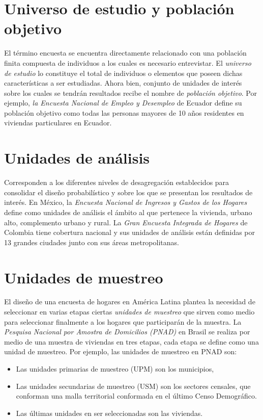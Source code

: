 \documentclass[
  spanish,
  12pt,
]{book}
\providecommand{\tightlist}{%
  \setlength{\itemsep}{0pt}\setlength{\parskip}{0pt}}
\begin{document}
\section{Universo de estudio y población objetivo}\label{universo-de-estudio-y-poblaciuxf3n-objetivo}

El término encuesta se encuentra directamente relacionado con una población finita compuesta de individuos a los cuales es necesario entrevistar. El \emph{universo de estudio} lo constituye el total de individuos o elementos que poseen dichas características a ser estudiadas. Ahora bien, conjunto de unidades de interés sobre los cuales se tendrán resultados recibe el nombre de \emph{población objetivo}. Por ejemplo, \emph{la Encuesta Nacional de Empleo y Desempleo} de Ecuador define su población objetivo como todas las personas mayores de 10 años residentes en viviendas particulares en Ecuador.

\section{Unidades de análisis}\label{unidades-de-anuxe1lisis}

Corresponden a los diferentes niveles de desagregación establecidos para consolidar el diseño probabilístico y sobre los que se presentan los resultados de interés. En México, la \emph{Encuesta Nacional de Ingresos y Gastos de los Hogares} define como unidades de análisis el ámbito al que pertenece la vivienda, urbano alto, complemento urbano y rural. La \emph{Gran Encuesta Integrada de Hogares} de Colombia tiene cobertura nacional y sus unidades de análisis están definidas por 13 grandes ciudades junto con sus áreas metropolitanas.

\section{Unidades de muestreo}\label{unidades-de-muestreo}

El diseño de una encuesta de hogares en América Latina plantea la necesidad de seleccionar en varias etapas ciertas \emph{unidades de muestreo} que sirven como medio para seleccionar finalmente a los hogares que participarán de la muestra. La \emph{Pesquisa Nacional por Amostra de Domicilios (PNAD)} en Brasil se realiza por medio de una muestra de viviendas en tres etapas, cada etapa se define como una unidad de muestreo. Por ejemplo, las unidades de muestreo en PNAD son:

\begin{itemize}
\tightlist
\item
  Las unidades primarias de muestreo (UPM) son los municipios,
\item
  Las unidades secundarias de muestreo (USM) son los sectores censales, que conforman una malla territorial conformada en el último Censo Demográfico.
\item
  Las últimas unidades en ser seleccionadas son las viviendas.
\end{itemize}
\end{document}
